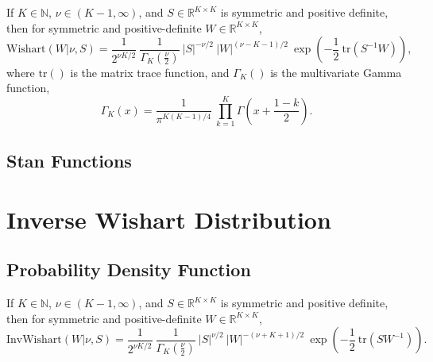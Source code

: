 \begin{description}
{\begin{description}
{If $K \in \mathbb{N}$, $\nu \in (K-1,\infty)$, and $S \in \mathbb{R}^{K \times K}$ is symmetric and positive definite, then for symmetric and positive-definite $W \in \mathbb{R}^{K \times K}$, \[ \text{Wishart}(W|\nu,S) = \frac{1}{2^{\nu K / 2}} \ \frac{1}{\Gamma_K \! \left( \frac{\nu}{2} \right)} \ \left| S \right|^{-\nu/2} \ \left| W \right|^{(\nu - K - 1)/2} \ \exp \! \left(- \frac{1}{2} \ \text{tr}\left( S^{-1} W \right) \right) \! , \] where $\text{tr}()$ is the matrix trace function, and $\Gamma_K()$ is the multivariate Gamma function, \[ \Gamma_K(x) = \frac{1}{\pi^{K(K-1)/4}} \ \prod_{k=1}^K \Gamma \left( x + \frac{1 - k}{2} \right) \!. \] 



\subsection{Stan Functions}


\begin{description}  \end{description}


\begin{description}  \end{description}


\section{Inverse Wishart Distribution}


\subsection{Probability Density Function}


If $K \in \mathbb{N}$, $\nu \in (K-1,\infty)$, and $S \in \mathbb{R}^{K \times   K}$ is symmetric and positive definite, then for symmetric and positive-definite $W \in \mathbb{R}^{K \times K}$, \[ \text{InvWishart}(W|\nu,S) = \frac{1}{2^{\nu K / 2}} \ \frac{1}{\Gamma_K \! \left( \frac{\nu}{2} \right)} \ \left| S \right|^{\nu/2} \ \left| W \right|^{-(\nu + K + 1)/2} \ \exp \! \left( - \frac{1}{2} \ \text{tr}(SW^{-1}) \right) \! . \] 

}
\end{description}}
\end{description}
